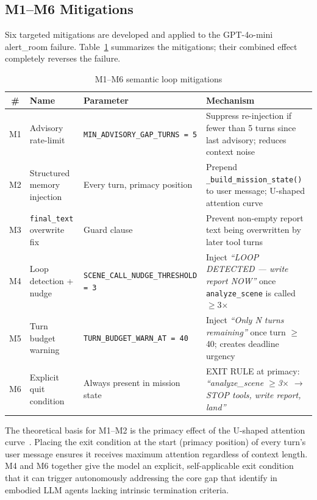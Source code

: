 \subsection{M1--M6 Mitigations}
\label{sec:ch4_nd2_mitigations}

Six targeted mitigations are developed and applied to the GPT-4o-mini alert\_room failure.
Table~\ref{tab:ch4_nd2_mitigations} summarizes the mitigations; their combined effect completely reverses the failure.

\begin{table}[ht]
  \caption{M1--M6 semantic loop mitigations}
  \label{tab:ch4_nd2_mitigations}
  \centering
  \small
  \renewcommand{\arraystretch}{1.25}
  \begin{tabular}{cllp{4.2cm}}
    \toprule
    \# & Name & Parameter & Mechanism \\
    \midrule
    M1 & Advisory rate-limit & \texttt{MIN\_ADVISORY\_GAP\_TURNS = 5}
       & Suppress re-injection if fewer than 5 turns since last advisory;
         reduces context noise~\cite{liu2023lostinthemiddle} \\
    M2 & Structured memory injection & Every turn, primacy position
       & Prepend \texttt{\_build\_mission\_state()} to user message;
         U-shaped attention curve~\cite{liu2023lostinthemiddle} \\
    M3 & \texttt{final\_text} overwrite fix & Guard clause
       & Prevent non-empty report text being overwritten by later tool turns \\
    M4 & Loop detection + nudge & \texttt{SCENE\_CALL\_NUDGE\_THRESHOLD = 3}
       & Inject \emph{``LOOP DETECTED --- write report NOW''} once
         \texttt{analyze\_scene} is called $\geq$3$\times$~\cite{runaway2025} \\
    M5 & Turn budget warning & \texttt{TURN\_BUDGET\_WARN\_AT = 40}
       & Inject \emph{``Only N turns remaining''} once turn $\geq$40;
         creates deadline urgency \\
    M6 & Explicit quit condition & Always present in mission state
       & EXIT RULE at primacy: \emph{``analyze\_scene $\geq$3$\times$ $\rightarrow$
         STOP tools, write report, land''}~\cite{yao2022react} \\
    \bottomrule
  \end{tabular}
\end{table}

The theoretical basis for M1--M2 is the primacy effect of the U-shaped attention curve~\cite{liu2023lostinthemiddle,foundinthemiddle2024}.
Placing the exit condition at the start (primacy position) of every turn's user message ensures it receives maximum attention regardless of context length.  
M4 and M6 together give the model an explicit, self-applicable exit condition that it can trigger autonomously addressing the core gap that \citet{runaway2025} identify in embodied LLM agents lacking intrinsic termination criteria.

